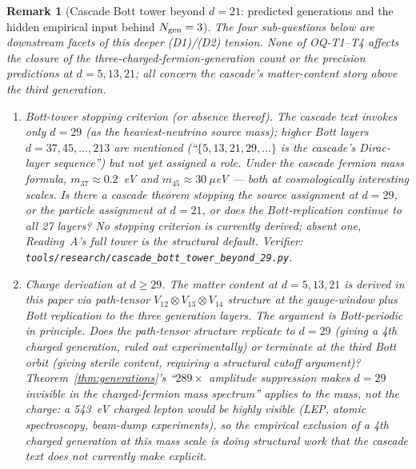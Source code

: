 \documentclass[12pt,a4paper]{article}
\newtheorem{remark}[theorem]{Remark}
\begin{document}
\begin{remark}[Cascade Bott tower beyond $d=21$: predicted generations and the hidden empirical input behind $N_{\rm gen}=3$]
The four sub-questions below are downstream facets of this deeper (D1)/(D2) tension. None of OQ-T1--T4 affects the closure of the three-charged-fermion-generation count or the precision predictions at $d=5, 13, 21$; all concern the cascade's matter-content story \emph{above} the third generation.

\begin{enumerate}[label=(OQ-T\arabic*),nosep]
\item \emph{Bott-tower stopping criterion (or absence thereof).} The cascade text invokes only $d=29$ (as the heaviest-neutrino source mass); higher Bott layers $d=37, 45, \ldots, 213$ are mentioned (``$\{5,13,21,29,\ldots\}$ is the cascade's Dirac-layer sequence'') but not yet assigned a role. Under the cascade fermion mass formula, $m_{37}\approx 0.2$~eV and $m_{45}\approx 30~\mu$eV --- both at cosmologically interesting scales. \emph{Is there a cascade theorem stopping the source assignment at $d=29$, or the particle assignment at $d=21$, or does the Bott-replication continue to all 27 layers?} No stopping criterion is currently derived; absent one, Reading~A's full tower is the structural default. Verifier: \texttt{tools/research/cascade\_bott\_tower\_beyond\_29.py}.

\item \emph{Charge derivation at $d \geq 29$.} The matter content at $d=5, 13, 21$ is derived in this paper via path-tensor $V_{12}\otimes V_{13}\otimes V_{14}$ structure at the gauge-window plus Bott replication to the three generation layers. The argument is Bott-periodic in principle. \emph{Does the path-tensor structure replicate to $d=29$ (giving a 4th charged generation, ruled out experimentally) or terminate at the third Bott orbit (giving sterile content, requiring a structural cutoff argument)?} Theorem~\ref{thm:generations}'s ``$289\times$ amplitude suppression makes $d=29$ invisible in the charged-fermion mass spectrum'' applies to the \emph{mass}, not the \emph{charge}: a 543~eV charged lepton would be highly visible (LEP, atomic spectroscopy, beam-dump experiments), so the empirical exclusion of a 4th charged generation at this mass scale is doing structural work that the cascade text does not currently make explicit.


\end{enumerate}
\end{remark}
\end{document}
